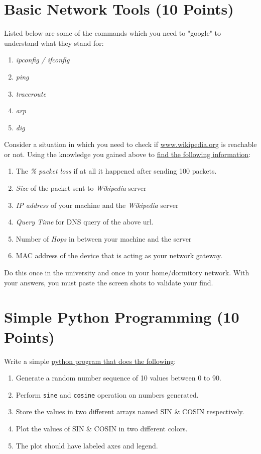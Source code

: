 \documentclass{WeSTassignment}
\begin{document}
\section{Basic Network Tools (10 Points)}

Listed below are some of the commands which you need to "google" to understand what they stand for:
\begin{enumerate}
\item \emph{ipconfig / ifconfig}
\item \emph{ping}
\item \emph{traceroute}
\item \emph{arp}
\item \emph{dig}
\end{enumerate}
Consider a situation in which you need to check if \url{www.wikipedia.org} is reachable or not. Using the knowledge you gained above to \underline{find the following information}:
\begin{enumerate}
\itemsep0em
\item The \emph{\% packet loss} if at all it happened after sending 100 packets. 
\item \emph{Size} of the packet sent to \emph{Wikipedia} server
\item \emph{IP address} of your machine and the \emph{Wikipedia} server
\item \emph{Query Time} for DNS query of the above url.
\item Number of \emph{Hops} in between your machine and the server
\item MAC address of the device that is acting as your network gateway. 
\end{enumerate}

Do this once in the university and once in your home/dormitory network. With your answers, you must paste the screen shots to validate your find.




\section{Simple Python Programming (10 Points)}

Write a simple \underline{python program that does the following}:
\begin{enumerate}
\item Generate a random number sequence of 10 values between 0 to 90. 
\item Perform \texttt{sine} and \texttt{cosine} operation on numbers generated. 
\item Store the values in two different arrays named SIN \& COSIN respectively. 
\item Plot the values of SIN \& COSIN in two different colors. 
\item The plot should have labeled axes and legend.
\end{enumerate}
\end{document}
